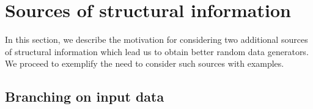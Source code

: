 \section{Sources of structural information}
\label{sec:sources}


In this section, we describe the motivation for considering two additional
sources of structural information which lead us to obtain better random data
generators. %
%
%
%
We proceed to exemplify the need to consider such sources with examples.

\subsection{Branching on input data}

